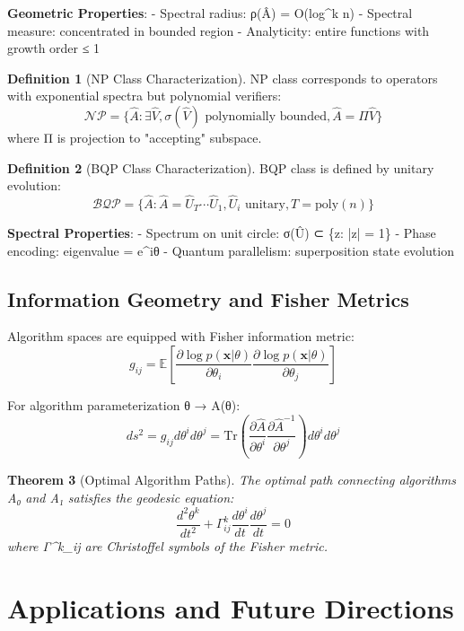 \documentclass[12pt]{article}
\theoremstyle{plain}
\newtheorem{theorem}{Theorem}[section]
\theoremstyle{definition}
\newtheorem{definition}[theorem]{Definition}
\begin{document}
\textbf{Geometric Properties}:
- Spectral radius: ρ(Â) = O(log^k n)
- Spectral measure: concentrated in bounded region
- Analyticity: entire functions with growth order ≤ 1

\begin{definition}[NP Class Characterization]
NP class corresponds to operators with exponential spectra but polynomial verifiers:
$$\mathcal{NP} = \{\hat{A}: \exists \hat{V}, \sigma(\hat{V}) \text{ polynomially bounded}, \hat{A} = \Pi \hat{V}\}$$
where Π is projection to "accepting" subspace.
\end{definition}

\begin{definition}[BQP Class Characterization]
BQP class is defined by unitary evolution:
$$\mathcal{BQP} = \{\hat{A}: \hat{A} = \hat{U}_T \cdots \hat{U}_1, \hat{U}_i \text{ unitary}, T = \text{poly}(n)\}$$
\end{definition}

\textbf{Spectral Properties}:
- Spectrum on unit circle: σ(Û) ⊂ \{z: |z| = 1\}
- Phase encoding: eigenvalue = e^{iθ}
- Quantum parallelism: superposition state evolution

\subsection{Information Geometry and Fisher Metrics}

Algorithm spaces are equipped with Fisher information metric:
$$g_{ij} = \mathbb{E}\left[\frac{\partial \log p(\mathbf{x}|\theta)}{\partial \theta_i} \frac{\partial \log p(\mathbf{x}|\theta)}{\partial \theta_j}\right]$$

For algorithm parameterization θ → A(θ):
$$ds^2 = g_{ij} d\theta^i d\theta^j = \text{Tr}\left(\frac{\partial \hat{A}}{\partial \theta^i} \frac{\partial \hat{A}^{-1}}{\partial \theta^j}\right) d\theta^i d\theta^j$$

\begin{theorem}[Optimal Algorithm Paths]
The optimal path connecting algorithms A₀ and A₁ satisfies the geodesic equation:
$$\frac{d^2 \theta^k}{dt^2} + \Gamma^k_{ij} \frac{d\theta^i}{dt} \frac{d\theta^j}{dt} = 0$$
where Γ^k_{ij} are Christoffel symbols of the Fisher metric.
\end{theorem}

\section{Applications and Future Directions}
\end{document}
